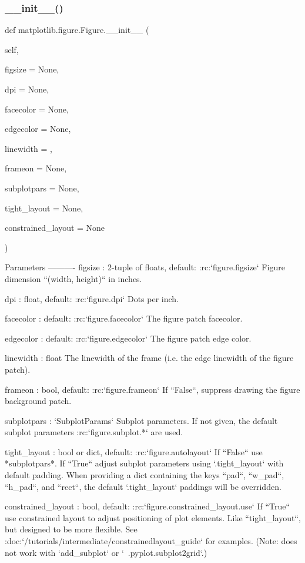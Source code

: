 \subsubsection{\texorpdfstring{\+\_\+\+\_\+init\+\_\+\+\_\+()}{\_\_init\_\_()}}
{\footnotesize\ttfamily def matplotlib.\+figure.\+Figure.\+\_\+\+\_\+init\+\_\+\+\_\+ (\begin{DoxyParamCaption}\item[{}]{self,  }\item[{}]{figsize = {\ttfamily None},  }\item[{}]{dpi = {\ttfamily None},  }\item[{}]{facecolor = {\ttfamily None},  }\item[{}]{edgecolor = {\ttfamily None},  }\item[{}]{linewidth = {},  }\item[{}]{frameon = {\ttfamily None},  }\item[{}]{subplotpars = {\ttfamily None},  }\item[{}]{tight\+\_\+layout = {\ttfamily None},  }\item[{}]{constrained\+\_\+layout = {\ttfamily None} }\end{DoxyParamCaption})}

\begin{DoxyVerb}Parameters
----------
figsize : 2-tuple of floats, default: :rc:`figure.figsize`
    Figure dimension ``(width, height)`` in inches.

dpi : float, default: :rc:`figure.dpi`
    Dots per inch.

facecolor : default: :rc:`figure.facecolor`
    The figure patch facecolor.

edgecolor : default: :rc:`figure.edgecolor`
    The figure patch edge color.

linewidth : float
    The linewidth of the frame (i.e. the edge linewidth of the figure
    patch).

frameon : bool, default: :rc:`figure.frameon`
    If ``False``, suppress drawing the figure background patch.

subplotpars : `SubplotParams`
    Subplot parameters. If not given, the default subplot
    parameters :rc:`figure.subplot.*` are used.

tight_layout : bool or dict, default: :rc:`figure.autolayout`
    If ``False`` use *subplotpars*. If ``True`` adjust subplot
    parameters using `.tight_layout` with default padding.
    When providing a dict containing the keys ``pad``, ``w_pad``,
    ``h_pad``, and ``rect``, the default `.tight_layout` paddings
    will be overridden.

constrained_layout : bool, default: :rc:`figure.constrained_layout.use`
    If ``True`` use constrained layout to adjust positioning of plot
    elements.  Like ``tight_layout``, but designed to be more
    flexible.  See
    :doc:`/tutorials/intermediate/constrainedlayout_guide`
    for examples.  (Note: does not work with `add_subplot` or
    `~.pyplot.subplot2grid`.)
\end{DoxyVerb}
 

